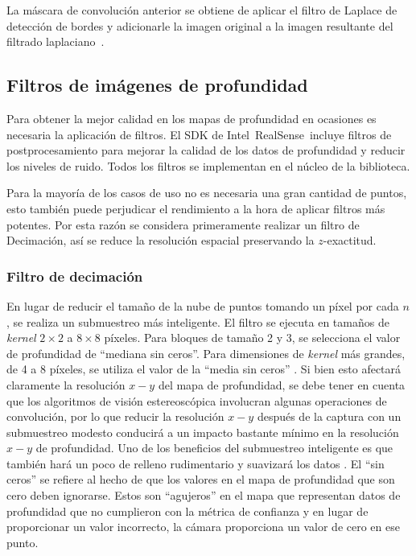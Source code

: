 La máscara de convolución anterior se obtiene de aplicar el filtro de Laplace de detección de bordes y adicionarle la imagen original a la imagen resultante del filtrado laplaciano~\cite{sharpen}.

\subsection{Filtros de imágenes de profundidad}

Para obtener la mejor calidad en los mapas de profundidad en ocasiones es necesaria la aplicación de filtros. El SDK de Intel\textregistered~RealSense\texttrademark~incluye filtros de postprocesamiento para mejorar la calidad de los datos de profundidad y reducir los niveles de ruido. Todos los filtros se implementan en el núcleo de la biblioteca.

Para la mayoría de los casos de uso no es necesaria una gran cantidad de puntos, esto también puede perjudicar el rendimiento a la hora de aplicar filtros más potentes. Por esta razón se considera primeramente realizar un filtro de Decimación, así se reduce la resolución espacial preservando la $z$-exactitud.

\subsubsection{Filtro de decimación}

En lugar de reducir el tamaño de la nube de puntos tomando un píxel por cada $n$, se realiza un submuestreo más inteligente. El filtro se ejecuta en tamaños de \textit{kernel} $2 \times 2$ a $8 \times 8$ píxeles. Para bloques de tamaño 2 y 3, se selecciona el valor de profundidad  de ``mediana sin ceros''. Para dimensiones de \textit{kernel} más grandes, de 4 a 8 píxeles, se utiliza el valor de la ``media sin ceros'' . Si bien esto afectará claramente la resolución $x-y$ del mapa de profundidad, se debe tener en cuenta que los algoritmos de visión estereoscópica involucran algunas operaciones de convolución, por lo que reducir la resolución $x-y$ después de la captura con un submuestreo modesto conducirá a un impacto bastante mínimo en la resolución $x-y$ de profundidad. Uno de los beneficios del submuestreo inteligente es que también hará un poco de relleno rudimentario y suavizará los datos . El ``sin ceros'' se refiere al hecho de que los valores en el mapa de profundidad que son cero deben ignorarse. Estos son ``agujeros'' en el mapa que representan datos de profundidad que no cumplieron con la métrica de confianza y en lugar de proporcionar un valor incorrecto, la cámara proporciona un valor de cero en ese punto.

